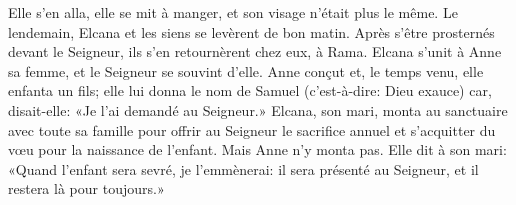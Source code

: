 Elle s’en alla, elle se mit à manger, et son visage n’était plus le même.
Le lendemain, Elcana et les siens se levèrent de bon matin.
	Après s’être prosternés devant le Seigneur, ils s’en retournèrent chez eux, à Rama.
Elcana s’unit à Anne sa femme, et le Seigneur se souvint d’elle.
Anne conçut et, le temps venu, elle enfanta un fils;
	elle lui donna le nom de Samuel (c’est-à-dire: Dieu exauce)
	car, disait-elle: «Je l’ai demandé au Seigneur.»
Elcana, son mari, monta au sanctuaire avec toute sa famille
	pour offrir au Seigneur le sacrifice annuel
	et s’acquitter du vœu pour la naissance de l’enfant.
	Mais Anne n’y monta pas.
Elle dit à son mari: «Quand l’enfant sera sevré, je l’emmènerai:
	il sera présenté au Seigneur, et il restera là pour toujours.»
